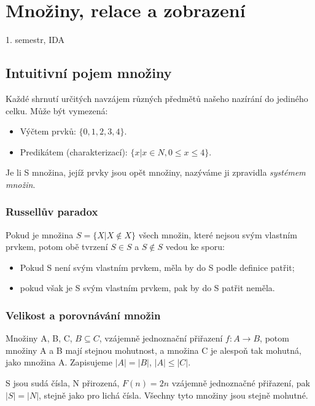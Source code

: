 \documentclass[a4wide]{report}
\begin{document}
\chapter{Množiny, relace a zobrazení} \label{cha:16}

1. semestr, IDA

\section{Intuitivní pojem množiny}

Každé shrnutí určitých navzájem různých předmětů našeho nazírání do jediného celku. Může být vymezená:
\begin{itemize}
	\item Výčtem prvků: $\{0, 1, 2, 3, 4\}$.
	\item Predikátem (charakterizací): $\{x | x \in N, 0 \leq x \leq 4\}$.
\end{itemize}

Je li S množina, jejíž prvky jsou opět množiny, nazýváme ji zpravidla \emph{systémem množin}.

\subsection{Russellův paradox}

Pokud je množina $S = \{ X | X \notin X\}$ všech množin, které nejsou svým vlastním prvkem, potom obě tvrzení $ S \in S $ a $ S \notin S$ vedou ke sporu:
\begin{itemize}
	\item Pokud S není svým vlastním prvkem, měla by do S podle definice patřit;
	\item pokud však je S svým vlastním prvkem, pak by do S patřit neměla.
\end{itemize}

\subsection{Velikost a porovnávání množin}

Množiny A, B, C, $B \subseteq C $, vzájemně jednoznační přiřazení $f: A  \to B$, potom množiny A a B mají stejnou mohutnost, a množina C je alespoň tak mohutná, jako množina A. Zapisujeme $|A| = |B|$, $|A| \leq |C|$.

S jsou sudá čísla, N přirozená, $F(n) = 2n$ vzájemně jednoznačné přiřazení, pak $|S| = |N|$, stejně jako pro lichá čísla. Všechny tyto množiny jsou stejně mohutné.
\end{document}

